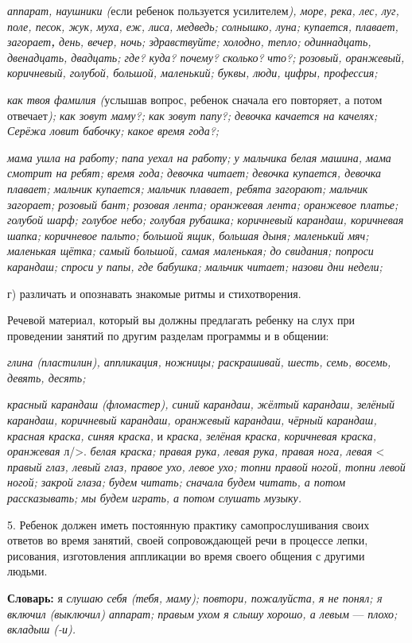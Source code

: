 \documentclass{book}
\renewcommand{\emph}[1]{\textit{#1}}
\begin{document}
\emph{аппарат, наушники (}если ребенок пользуется усилителем\emph{),
море, река, лес, луг, поле, песок, жук, муха, еж, лиса, медведь;
солнышко, луна; купается, плавает, загорает\textbf{,} день, вечер, ночь;
здравствуйте; холодно, тепло; одиннадцать, двенадцать, двадцать; где?
куда? почему? сколько?} \emph{что?; розовый, оранжевый, коричневый,
голубой, большой, маленький; буквы, люди, цифры, профессия;}

\emph{как твоя фамилия (}услышав вопрос, ребенок сначала его повторяет,
а потом отвечает\emph{); как зовут маму?; как зовут папу?; девочка
качается на качелях; Серёжа ловит бабочку; какое время года?;}

\emph{мама ушла на работу; папа уехал на работу; у мальчика белая
машина, мама смотрит на ребят; время года; девочка читает; девочка
купается, девочка плавает; мальчик купается; мальчик плавает, ребята
загорают; мальчик загорает; розовый бант; розовая лента; оранжевая
лента; оранжевое платье; голубой шарф; голубое небо; голубая рубашка;
коричневый карандаш, коричневая шапка; коричневое пальто; большой ящик,
большая дыня; маленький мяч; маленькая щётка; самый большой, самая
маленькая; до свидания; попроси карандаш; спроси у папы, где бабушка;
мальчик читает; назови дни недели;}

г) различать и опознавать знакомые ритмы и стихотворения.

Речевой материал, который вы должны предлагать ребенку на слух при
проведении занятий по другим разделам программы и в общении:

\emph{глина (пластилин), аппликация, ножницы; раскрашивай, шесть, семь,
восемь, девять, десять;}

\emph{красный карандаш (фломастер), синий карандаш, жёлтый карандаш,
зелёный карандаш, коричневый карандаш, оранжевый карандаш, чёрный
карандаш, красная краска, синяя краска,} и \emph{краска, зелёная краска,
коричневая краска, оранжевая} л/\textgreater. \emph{белая краска; правая
рука, левая рука, правая нога, левая} \textless{} \emph{правый глаз,
левый глаз, правое ухо, левое ухо; топни правой} \emph{ногой, топни
левой ногой; закрой глаза; будем читать; сначала будем читать, а потом
рассказывать; мы будем играть, а потом слушать музыку.}

5. Ребенок должен иметь постоянную практику самопрослушивания своих
ответов во время занятий, своей сопровождающей речи в процессе лепки,
рисования, изготовления аппликации во время своего общения с другими
людьми.

\textbf{Словарь:} я \emph{слушаю себя (тебя, маму); повтори, пожалуйста,
я не понял; \textsc{я} включил (выключил) аппарат; правым ухом я слышу}
\emph{хорошо, а левым} --- \emph{плохо; вкладыш (-и).}
\end{document}
